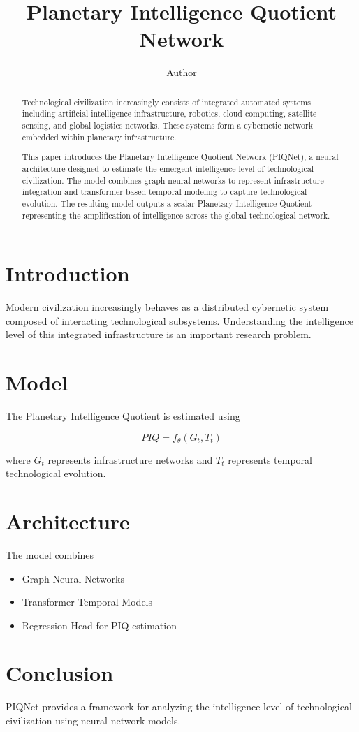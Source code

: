 \documentclass{article}
\title{Planetary Intelligence Quotient Network}
\author{Author}
\date{}
\begin{document}
\maketitle

\begin{abstract}
Technological civilization increasingly consists of integrated automated systems including artificial intelligence infrastructure, robotics, cloud computing, satellite sensing, and global logistics networks. These systems form a cybernetic network embedded within planetary infrastructure.

This paper introduces the Planetary Intelligence Quotient Network (PIQNet), a neural architecture designed to estimate the emergent intelligence level of technological civilization. The model combines graph neural networks to represent infrastructure integration and transformer-based temporal modeling to capture technological evolution. The resulting model outputs a scalar Planetary Intelligence Quotient representing the amplification of intelligence across the global technological network.
\end{abstract}

\section{Introduction}

Modern civilization increasingly behaves as a distributed cybernetic system composed of interacting technological subsystems. Understanding the intelligence level of this integrated infrastructure is an important research problem.

\section{Model}

The Planetary Intelligence Quotient is estimated using

\[
PIQ = f_\theta(G_t, T_t)
\]

where \(G_t\) represents infrastructure networks and \(T_t\) represents temporal technological evolution.

\section{Architecture}

The model combines

\begin{itemize}
\item Graph Neural Networks
\item Transformer Temporal Models
\item Regression Head for PIQ estimation
\end{itemize}

\section{Conclusion}

PIQNet provides a framework for analyzing the intelligence level of technological civilization using neural network models.
\end{document}
